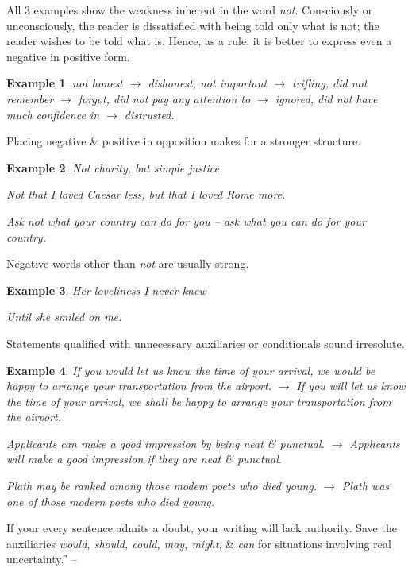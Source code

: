 \documentclass{article}
\numberwithin{equation}{section}
\newtheorem{example}{Example}[section]
\begin{document}
All 3 examples show the weakness inherent in the word \textit{not}. Consciously or unconsciously, the reader is dissatisfied with being told only what is not; the reader wishes to be told what is. Hence, as a rule, it is better to express even a negative in positive form.
\begin{example}
	not honest $\to$ dishonest, not important $\to$ trifling, did not remember $\to$ forgot, did not pay any attention to $\to$ ignored, did not have much confidence in $\to$ distrusted.
\end{example}
Placing negative \& positive in opposition makes for a stronger structure.
\begin{example}
	Not charity, but simple justice.
	
	Not that I loved Caesar less, but that I loved Rome more.
	
	Ask not what your country can do for you -- ask what you can do for your country.
\end{example}
Negative words other than \textit{not} are usually strong.
\begin{example}
	Her loveliness I never knew
	
	Until she smiled on me.
\end{example}
Statements qualified with unnecessary auxiliaries or conditionals sound irresolute.
\begin{example}
	If you would let us know the time of your arrival, we would be happy to arrange your transportation from the airport. $\to$ If you will let us know the time of your arrival, we shall be happy to arrange your transportation from the airport.
	
	Applicants can make a good impression by being neat \& punctual. $\to$  Applicants will make a good impression if they are neat \& punctual.
	
	Plath may be ranked among those modem poets who died young. $\to$ Plath was one of those modern poets who died young.
\end{example}
If your every sentence admits a doubt, your writing will lack authority. Save the auxiliaries \textit{would, should, could, may, might}, \& \textit{can} for situations involving real uncertainty.'' -- \cite[pp. 33--34]{Strunk_White2019}

\end{document}
